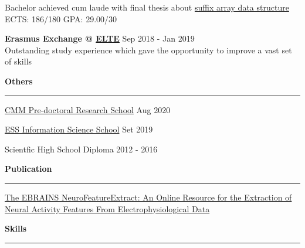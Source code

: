 \documentclass[11pt,letterpaper]{article}
\begin{document}
\begin{justify}
\begin{itemize}[label={}, leftmargin=0pt]
\begin{item}
		      Bachelor achieved cum laude with final thesis about \href{https://dariocurr.github.io/assets/img/poster.png}{suffix array data structure}
		      \\
		      ECTS: 186/180 \hspace{0.33cm} GPA: 29.00/30
		\end{item}
		\begin{item}
		      \textbf{Erasmus Exchange @ \href{https://www.elte.hu/en/}{ELTE}}
		      \hfill
		      Sep 2018 - Jan 2019
		      \vspace{0.05cm}
		      \\
		      Outstanding study experience which gave the opportunity to improve a vast set of skills
		\end{item}
	\end{itemize}
	\setlength{\columnsep}{0.75cm}
	\begin{multicols}{2}
		\textbf{Others}\strut
		\hrule
		\begin{itemize}[label={}, itemsep=-5pt, leftmargin=0pt]
			\begin{item}
			      \href{https://cmmrs2020.mpi-sws.org/}{CMM Pre-doctoral Research School}
			      \hfill
			      Aug 2020
			\end{item}
			\begin{item}
			      \href{http://einfose.ffos.hr/summer-school/}{ESS Information Science School}
			      \hfill
			      Set 2019
			\end{item}
			\begin{item}
			      Scientfic High School Diploma
			      \hfill
			      2012 - 2016
			\end{item}
		\end{itemize}
		\vspace*{\fill}
		\columnbreak
		\textbf{Publication}\strut
		\hrule
		\begin{itemize}[label={}, leftmargin=0pt, noitemsep]
			\begin{item}
			      \href{https://www.frontiersin.org/articles/10.3389/fninf.2021.713899/full}{The EBRAINS NeuroFeatureExtract: An Online Resource for the Extraction of Neural Activity Features From Electrophysiological Data}
			\end{item}
		\end{itemize}
		\vspace*{\fill}
	\end{multicols}
	\vspace{0.1cm}
	{\large \textbf{Skills}\strut}
	\hrule
	\begin{multicols}{3}

\end{multicols}
\end{justify}
\end{document}
